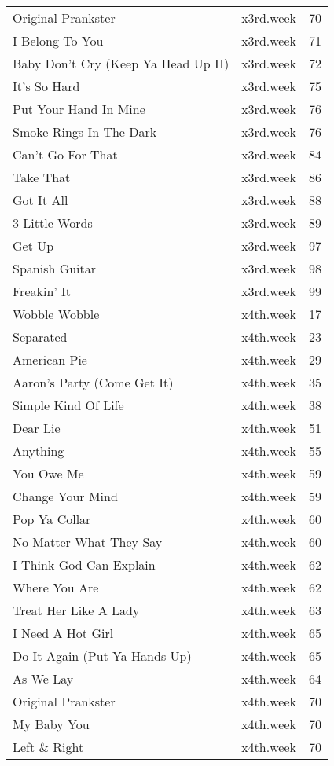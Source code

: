 \begin{table}[ht]
\begin{tabular}{llr}
  Original Prankster & x3rd.week &  70 \\ 
  I Belong To You & x3rd.week &  71 \\ 
  Baby Don't Cry (Keep Ya Head Up II) & x3rd.week &  72 \\ 
  It's So Hard & x3rd.week &  75 \\ 
  Put Your Hand In Mine & x3rd.week &  76 \\ 
  Smoke Rings In The Dark & x3rd.week &  76 \\ 
  Can't Go For That & x3rd.week &  84 \\ 
  Take That & x3rd.week &  86 \\ 
  Got It All & x3rd.week &  88 \\ 
  3 Little Words & x3rd.week &  89 \\ 
  Get Up & x3rd.week &  97 \\ 
  Spanish Guitar & x3rd.week &  98 \\ 
  Freakin' It & x3rd.week &  99 \\ 
  Wobble Wobble & x4th.week &  17 \\ 
  Separated & x4th.week &  23 \\ 
  American Pie & x4th.week &  29 \\ 
  Aaron's Party (Come Get It) & x4th.week &  35 \\ 
  Simple Kind Of Life & x4th.week &  38 \\ 
  Dear Lie & x4th.week &  51 \\ 
  Anything & x4th.week &  55 \\ 
  You Owe Me & x4th.week &  59 \\ 
  Change Your Mind & x4th.week &  59 \\ 
  Pop Ya Collar & x4th.week &  60 \\ 
  No Matter What They Say & x4th.week &  60 \\ 
  I Think God Can Explain & x4th.week &  62 \\ 
  Where You Are & x4th.week &  62 \\ 
  Treat Her Like A Lady & x4th.week &  63 \\ 
  I Need A Hot Girl & x4th.week &  65 \\ 
  Do It Again (Put Ya Hands Up) & x4th.week &  65 \\ 
  As We Lay & x4th.week &  64 \\ 
  Original Prankster & x4th.week &  70 \\ 
  My Baby You & x4th.week &  70 \\ 
  Left \& Right & x4th.week &  70 \\ 

\end{tabular}
\end{table}
